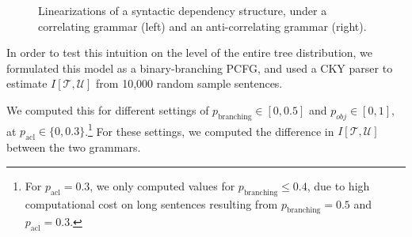 \documentclass[10pt,twoside,lineno]{article}
\begin{document}
\begin{figure}[ht]
    \centering
{
}
	\caption{Linearizations of a syntactic dependency structure, under a correlating grammar (left) and an anti-correlating grammar (right).}
	\label{fig:sent-dep}
\end{figure}


In order to test this intuition on the level of the entire tree distribution, we formulated this model as a binary-branching PCFG, and used a CKY parser to estimate $I[\mathcal{T}, \mathcal{U}]$ from 10,000 random sample sentences.

We computed this for different settings of $p_\text{branching} \in [0, 0.5]$ and $p_{obj} \in [0,1]$, at $p_\text{acl} \in \{0, 0.3\}$.\footnote{For $p_\text{acl} = 0.3$, we only computed values for $p_\text{branching} \leq 0.4$, due to high computational cost on long sentences resulting from $p_\text{branching} = 0.5$ and $p_\text{acl} = 0.3$.}
For these settings, we computed the difference in $I[\mathcal{T}, \mathcal{U}]$ between the two grammars.
\end{document}
